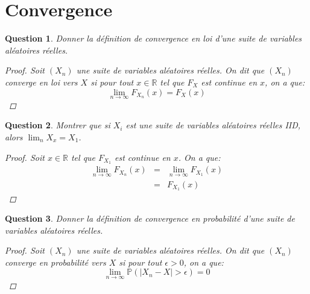 \documentclass{article}
\theoremstyle{plain}
\newtheorem{question}{Question}
\begin{document}
\section{Convergence}

\begin{question}
	Donner la définition de convergence en loi d'une suite de variables aléatoires réelles.
	\begin{proof}
		Soit $(X_n)$ une suite de variables aléatoires réelles. On dit que $(X_n)$ converge en loi vers $X$ si pour tout $x \in \mathbb{R}$ tel que $F_X$ est continue en $x$, on a que:
		\begin{equation*}
			\lim_{n \to \infty} F_{X_n} (x) = F_X (x)
		\end{equation*}
	\end{proof}

\end{question}

\begin{question}
	Montrer que si $X_i$ est une suite de variables aléatoires réelles IID, alors $\lim_n X_x = X_1$.
	\begin{proof}
		Soit $x \in \mathbb{R}$ tel que $F_{X_1}$ est continue en $x$. On a que:
		\begin{eqnarray*}
			\lim_{n \to \infty} F_{X_n} (x) &=& \lim_{n \to \infty} F_{X_1} (x) \\
			&=& F_{X_1} (x)
		\end{eqnarray*}
	\end{proof}
\end{question}


\begin{question}
	Donner la définition de convergence en probabilité d'une suite de variables aléatoires réelles.
	\begin{proof}
		Soit $(X_n)$ une suite de variables aléatoires réelles. On dit que $(X_n)$ converge en probabilité vers $X$ si pour tout $\epsilon > 0$, on a que:
		\begin{equation*}
			\lim_{n \to \infty} \mathbb{P} (|X_n - X| > \epsilon) = 0
		\end{equation*}
	\end{proof}
\end{question}
\end{document}
